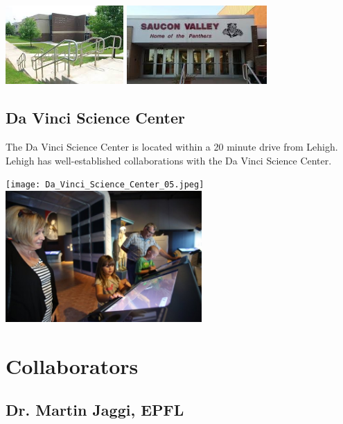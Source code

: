 \documentclass[11pt]{SelfArx}
\begin{document}
 
 \begin{center}
\includegraphics[height=3cm]{svsd.jpeg}
\includegraphics[height=3cm]{images.jpeg} 
\end{center}

\subsection*{Da Vinci Science Center}
The Da Vinci Science Center is located within a 20 minute drive from Lehigh.  Lehigh has well-established collaborations with the Da Vinci Science Center.

\begin{center}
\texttt{[image: Da\_Vinci\_Science\_Center\_05.jpeg]}
\includegraphics[height=5cm]{Be-the-Astro3.jpg}
\end{center}
 


\section*{Collaborators}   



\subsection*{Dr. Martin Jaggi, EPFL} 
\end{document}
